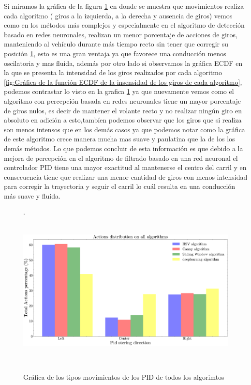Si miramos la gráfica de la figura \ref{fig:Gráfica de los tipos movimientos de los PID de todos los algorimtos} en donde se muestra que movimientos realiza cada algoritmo ( giros a la izquierda, a la derecha y ausencia de giros) vemos como en los métodos más complejos y especialmente en el algoritmo de detección basado en redes neuronales, realizan un menor porcentaje de acciones de giros, manteniendo al vehículo durante más tiempo recto sin tener que corregir su posición \ref{fig:Gráfica de los tipos movimientos de los PID de todos los algorimtos}, esto es una gran ventaja ya que favorece una conducción menos oscilatoria y mas fluida, además por otro lado si observamos la gráfica ECDF en la que se presenta la intensidad de los giros realizados por cada algoritmo \ref{fig:Gráfica de la función ECDF de la insensidad de los giros de cada algoritmo},  podemos contrastar lo visto en la grafica \ref{fig:Gráfica de los tipos movimientos de los PID de todos los algorimtos} ya que nuevamente vemos como el algoritmo con percepción basada en redes neuronales tiene un mayor porcentaje de giros nulos, es decir de mantener el volante recto y no realizar ningún giro en absoluto en adición a esto,tambíen podemos observar que  los giros que si realiza son menos  intensos que en los demás casos ya que podemos notar como la gráfica de este algoritmo crece manera mucha mas suave y paulatina que la de los los demás métodos. Lo que podemos concluir de esta información es que debido a la mejora de percepción en el algoritmo de filtrado basado en una red neuronal el controlador \ac{PID} tiene una mayor exactitud al mantenerse el centro del carril y en consecuencia tiene que realizar una menor cantidad de giros con menos intensidad para corregir la trayectoria y seguir el carril lo cuál resulta en una conducción más suave y fluida.

\begin{figure}[t]
    \centering.
    \includegraphics[height=8cm]{imagenes/cap4/graphics_comparison/pid_curling.pdf}
    \caption{Gráfica de los tipos movimientos de los PID de todos los algorimtos}
    \label{fig:Gráfica de los tipos movimientos de los PID de todos los algorimtos}
\end{figure}

